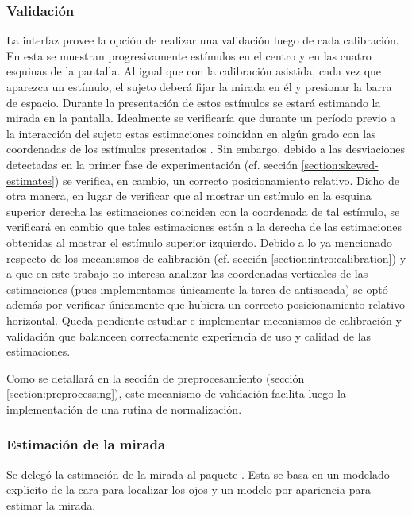 \subsubsection{Validación}

La interfaz \jspsych provee la opción de realizar una validación luego de cada
calibración.
En esta se muestran progresivamente estímulos en el centro y en las cuatro
esquinas de la pantalla.
Al igual que con la calibración asistida, cada vez que aparezca un estímulo, el
sujeto deberá fijar la mirada en él y presionar la barra de espacio.
Durante la presentación de estos estímulos se estará estimando la mirada en la
pantalla.
Idealmente se verificaría que durante un período previo a la interacción del
sujeto estas estimaciones coincidan en algún grado con las coordenadas de los
estímulos presentados \cite{huang_2016_pace}.
Sin embargo, debido a las desviaciones detectadas en la primer fase de
experimentación (cf. sección \ref{section:skewed-estimates}) se
verifica, en cambio, un correcto posicionamiento relativo.
Dicho de otra manera, en lugar de verificar que al mostrar un estímulo en la
esquina superior derecha las estimaciones coinciden con la coordenada de tal
estímulo, se verificará en cambio que tales estimaciones están a la derecha de
las estimaciones obtenidas al mostrar el estímulo superior izquierdo.
Debido a lo ya mencionado respecto de los mecanismos de calibración (cf.
sección \ref{section:intro:calibration}) y a que en este trabajo no interesa
analizar las coordenadas verticales de las estimaciones (pues implementamos
únicamente la tarea de antisacada) se optó además por verificar únicamente que
hubiera un correcto posicionamiento relativo horizontal.
Queda pendiente estudiar e implementar mecanismos de calibración y validación
que balanceen correctamente experiencia de uso y calidad de las estimaciones.

Como se detallará en la sección de preprocesamiento (sección
\ref{section:preprocessing}), este mecanismo de validación facilita luego la
implementación de una rutina de normalización.

\subsubsection{Estimación de la mirada}

Se delegó la estimación de la mirada al paquete \webgazer
\cite{papoutsaki_2016_webgazer}.
Esta se basa en un modelado explícito de la cara para localizar los ojos y un
modelo por apariencia para estimar la mirada.

